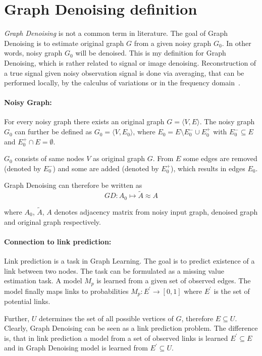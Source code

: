 \section{Graph Denoising definition}

\textit{Graph Denoising} is not a common term in literature.
The goal of Graph Denoising is to estimate original graph $G$ from a given noisy graph $G_0$.
In other words, noisy graph $G_0$ will be denoised.
This is my definition for Graph Denoising, which is rather related to signal or image denoising.
Reconstruction of a true signal given noisy observation signal is done via averaging, that can be performed
locally, by the calculus of variations or in the frequency domain~\cite{noneLocalMean}. 

\paragraph{Noisy Graph:}
For every noisy graph there exists an original graph $G = \langle V,E \rangle$.
The noisy graph $G_0$ can further be defined as $G_0 = \langle V, E_0 \rangle$,  
 where $E_0 = E \setminus  E^{-}_0 \cup  E^{+}_0$ with $E^{-}_0 \subseteq E$ and $E^{+}_0 \cap E = \emptyset$.

$G_0$ consists of same nodes $V$ as original graph $G$. 
From $E$ some edges are removed (denoted by $E^{-}_0$) and some are added
(denoted by $E^{+}_0$), which results in edges $E_0$.

Graph Denoising can therefore be written as 
\begin{equation}
    GD: A_0 \mapsto \tilde{A} \approx A
\end{equation}

where $A_0$, $\tilde{A}$, $A$ denotes adjacency matrix from noisy input graph, denoised graph and original graph respectively.


\paragraph{Connection to link prediction:}
Link prediction is a task in Graph Learning. 
The goal is to predict existence of a link between two nodes.
The task can be formulated as a missing value estimation task. A model $M_p$ is learned
from a given set of observed edges. The model finally maps links to probabilities
$M_p : E^{\prime} \rightarrow [0,1]$ where $E^{\prime}$ is the set of potential links.

Further, $U$ determines the set of all possible vertices of $G$, therefore $E \subseteq U$.
Clearly, Graph Denoising can be seen as a link prediction problem.
The difference is, that in link prediction a model from a set of observed links is learned
$E^{\prime} \subseteq E$ and in Graph Denoising model is learned from 
$E^{\prime} \subseteq U$. 


